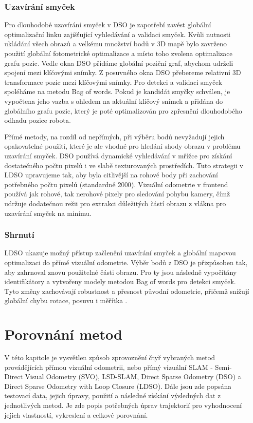 \documentclass[12pt,a4paper]{article}
\begin{document}
\subsubsection*{Uzavírání smyček}
Pro dlouhodobé uzavírání smyček v DSO je zapotřebí zavést globální optimalizační linku zajišťující vyhledávání a validaci smyček. Kvůli nutnosti ukládání všech obrazů a velkému množství bodů v 3D mapě bylo zavrženo použití globální fotometrické optimalizace a místo toho zvolena optimalizace grafu pozic. Vedle okna DSO přidáme globální poziční graf, abychom udrželi spojení mezi klíčovými snímky. Z posuvného okna DSO přebereme relativní 3D transformace pozic mezi klíčovými snímky. Pro detekci a validaci smyček spoléháme na metodu Bag of words. Pokud je kandidát smyčky schválen, je vypočtena jeho vazba s ohledem na aktuální klíčový snímek a přidána do globálního grafu pozic, který je poté optimalizován pro zpřesnění dlouhodobého odhadu pozice robota.

Přímé metody, na rozdíl od nepřímých, při výběru bodů nevyžadují jejich opakovatelné použití, které je ale vhodné pro hledání shody obrazu v problému uzavírání smyček. DSO používá dynamické vyhledávání v mřížce pro získání dostatečného počtu pixelů i ve slabě texturovaných prostředích. Tuto strategii v LDSO upravujeme tak, aby byla citlivější na rohové body při zachování potřebného počtu pixelů (standardně 2000). Vizuální odometrie v frontend používá jak rohové, tak nerohové pixely pro sledování pohybu kamery, čímž udržuje dodatečnou režii pro extrakci důležitých částí obrazu z vlákna pro uzavírání smyček na minimu.

\subsubsection*{Shrnutí}
LDSO ukazuje možný přístup začlenění uzavírání smyček a globální mapovou optimalizaci do přímé vizuální odometrie. Výběr bodů z DSO je přizpůsoben tak, aby zahrnoval znovu použitelné části obrazu. Pro ty jsou následně vypočítány identifikátory a vytvořeny modely metodou Bag of words pro detekci smyček. Tyto změny zachovávají robustnost a přesnost původní odometrie, přičemž snižují globální chybu rotace, posuvu i měřítka \cite{LDSO}.


\section{Porovnání metod}
V této kapitole je vysvětlen způsob zprovoznění čtyř vybraných metod provádějících přímou vizuální odometrii, nebo přímý vizuální SLAM - Semi-Direct Visual Odometry (SVO), LSD-SLAM, Direct Sparse Odometry (DSO) a Direct Sparse Odometry with Loop Closure (LDSO). Dále jsou zde popsána testovací data, jejich úpravy, použití a následné získání výsledných dat z jednotlivých metod. Je zde popis potřebných úprav trajektorií pro vyhodnocení jejich vlastností, vykreslení a celkové porovnání.
\end{document}
